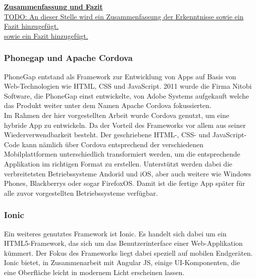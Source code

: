 \textbf{\underline{Zusammenfassung und Fazit}}\\





\underline{TODO: An dieser Stelle wird ein Zusammenfassung der Erkenntnisse sowie ein Fazit hinzugefügt. }\\
\underline{sowie ein Fazit hinzugefügt.}

\subsubsection{Phonegap und Apache Cordova}
PhoneGap entstand als Framework zur Entwicklung von Apps auf Basis von Web-Technologien wie HTML, CSS und JavaScript. 2011 wurde die Firma Nitobi Software, die PhoneGap einst entwickelte, von Adobe Systems aufgekauft welche das Produkt weiter unter dem Namen Apache Cordova fokussierten. 
\\
Im Rahmen der hier vorgestellten Arbeit wurde Cordova genutzt, um eine hybride App zu entwickeln. Da der Vorteil des Frameworks vor allem aus seiner Wiederverwendbarkeit besteht. Der geschriebene HTML-, CSS- und JavaScript-Code kann nämlich über Cordova entsprechend der verschiedenen Mobilplattformen unterschiedlich transformiert werden, um die entsprechende Applikation im richtigen Format zu erstellen. Unterstützt werden dabei die verbreitetsten Betriebssysteme Andorid und iOS, aber auch weitere wie Windows Phones, Blackberrys oder sogar FirefoxOS. Damit ist die fertige App später für alle zuvor vorgestellten Betriebssysteme verfügbar.

\subsubsection{Ionic}
Ein weiteres genutztes Framework ist Ionic. Es handelt sich dabei um ein HTML5-Framework, das sich um das Benutzerinterface einer Web-Applikation kümmert. Der Fokus des Frameworks liegt dabei speziell auf mobilen Endgeräten.
Ionic bietet, in Zusammenarbeit mit Angular JS, einige UI-Komponenten, die eine Oberfläche leicht in modernem Licht erscheinen lassen.

